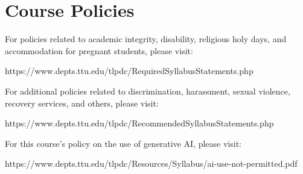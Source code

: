 \documentclass[10pt]{article}
\begin{document}
  
  \newpage
  

  
  \section*{Course Policies}

For policies related to academic integrity, disability, religious holy days, and accommodation for pregnant students, please visit:

https://www.depts.ttu.edu/tlpdc/RequiredSyllabusStatements.php

 

For additional policies related to discrimination, harassment, sexual violence, recovery services, and others, please visit:

https://www.depts.ttu.edu/tlpdc/RecommendedSyllabusStatements.php

 

For this course’s policy on the use of generative AI, please visit:

https://www.depts.ttu.edu/tlpdc/Resources/Syllabus/ai-use-not-permitted.pdf
\end{document}
